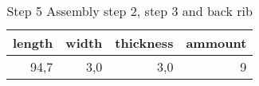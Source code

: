 \begin{table}[h!]
\centering
\caption{Step 5 Assembly step 2, step 3 and back rib}
\begin{tabular}{rrrr}
\toprule
 length &  width &  thickness &  ammount \\
\midrule
   94,7 &    3,0 &        3,0 &        9 \\
\bottomrule
\end{tabular}
\end{table}
